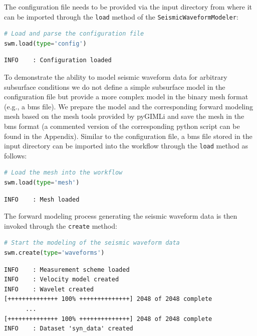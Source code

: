 \documentclass[a4paper,fleqn]{cas-sc}
\begin{document}
The configuration file needs to be provided via the input directory from where it can be imported through the \texttt{load} method of the \texttt{SeismicWaveformModeler}:
\begin{lstlisting}[language=Python, firstnumber=6]
# Load and parse the configuration file
swm.load(type='config')
\end{lstlisting}
\begin{footnotesize}
\begin{verbatim}
INFO    : Configuration loaded
\end{verbatim}
\end{footnotesize}
To demonstrate the ability to model seismic waveform data for arbitrary subsurface conditions we do not define a simple subsurface model in the configuration file but provide a more complex model in the binary mesh format (e.g., a bms file). We prepare the model and the corresponding forward modeling mesh based on the mesh tools provided by pyGIMLi and save the mesh in the bms format (a commented version of the corresponding python script can be found in the Appendix). Similar to the configuration file, a bms file stored in the input directory can be imported into the workflow through the \texttt{load} method as follows:
\begin{lstlisting}[language=Python, firstnumber=8]
# Load the mesh into the workflow
swm.load(type='mesh')
\end{lstlisting}
\begin{footnotesize}
\begin{verbatim}
INFO    : Mesh loaded
\end{verbatim}
\end{footnotesize}
The forward modeling process generating the seismic waveform data is then invoked through the \texttt{create} method:
\begin{lstlisting}[language=Python, firstnumber=10]
# Start the modeling of the seismic waveform data
swm.create(type='waveforms')
\end{lstlisting}
\begin{footnotesize}
\begin{verbatim}
INFO    : Measurement scheme loaded
INFO    : Velocity model created
INFO    : Wavelet created
[++++++++++++++ 100% ++++++++++++++] 2048 of 2048 complete
      ...
[++++++++++++++ 100% ++++++++++++++] 2048 of 2048 complete
INFO    : Dataset 'syn_data' created
\end{verbatim}
\end{footnotesize}
\end{document}
